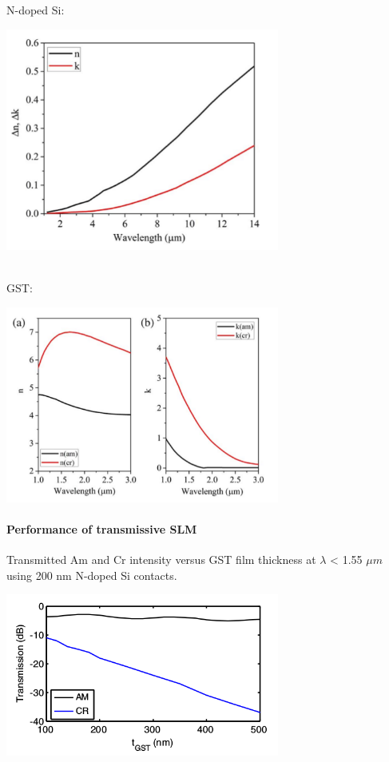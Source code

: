 \documentclass[]{article}
\let\oldparagraph\paragraph
\renewcommand{\paragraph}[1]{\oldparagraph{#1}\mbox{}}
\begin{document}
N-doped Si:\\
\centerline{\includegraphics[width = 9cm]{image/002_06.png}}\\
GST:\\
\centerline{\includegraphics[width = 9cm]{image/002_07.png}}

\paragraph{Performance of transmissive
SLM}\label{performance-of-transmissive-slm}

Transmitted Am and Cr intensity versus GST film thickness at $\lambda$ < 1.55 $\mu m$
using 200 nm N-doped Si contacts.\\
\centerline{\includegraphics[width = 9cm]{image/002_08.png}}
\end{document}
